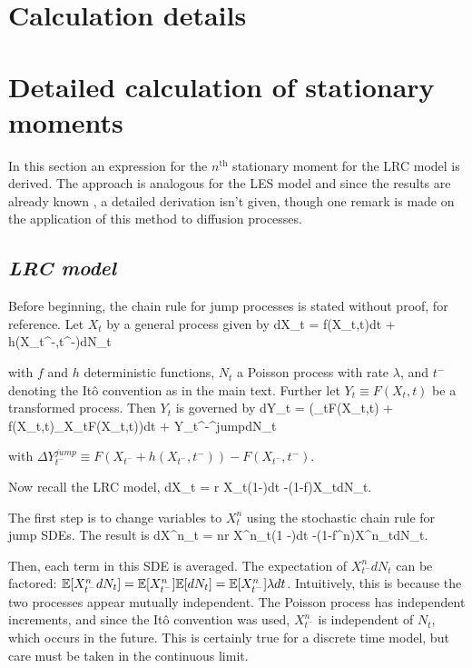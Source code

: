 
\section{Calculation details}
\label{section:calculation_details}

\section*{Detailed calculation of stationary moments}
In this section an expression for the $n^{\text{th}}$ stationary moment for the LRC model is derived.  The approach is analogous for the LES model and since the results are already known \cite{engen2000}, a detailed derivation isn't given, though one remark is made on the application of this method to diffusion processes.

\subsection*{\textit{LRC model}}

Before beginning, the chain rule for jump processes \cite{hansonBook} is stated without proof, for reference.  Let $X_t$ by a general process given by
\be
dX_t = f(X_t,t)dt + h(X_{t^-},t^-)dN_t
\ee

\noindent with $f$ and $h$ deterministic functions, $N_t$ a Poisson process with rate $\lambda$, and $t^-$ denoting the It\^{o} convention as in the main text.  Further let $Y_t \equiv F(X_t,t)$ be a transformed process.  Then $Y_t$ is governed by
\be
dY_t = \left(\partial_tF(X_t,t) + f(X_t,t)\partial_{X_t}F(X_t,t)\right)dt + \Delta Y_{t^-}^{jump}dN_t
\ee

\noindent with $\Delta Y_{t^-}^{jump} \equiv F(X_{t^-} + h(X_{t^-},t^-)) - F(X_{t^-},t^-)$.


Now recall the LRC model,
\be
dX_t = r X_t\left(1-\right)dt  -(1-f)X_tdN_t.
\ee

\noindent The first step is to change variables to $X^n_t$ using the stochastic chain rule for jump SDEs.  The result is
\be
dX^n_t = nr X^n_t\left(1 -\right)dt -(1-f^n)X^n_tdN_t.
\ee

\noindent Then, each term in this SDE is averaged.  The expectation of $X^n_{t^-}dN_t$ can be factored:  $\mathbb{E}[X^n_{t^-}dN_t] = \mathbb{E}[X^n_{t^-}]\mathbb{E}[dN_t] = \mathbb{E}[X^n_{t^-}]\lambda dt$.  Intuitively, this is because the two processes appear mutually independent.  The Poisson process has independent increments, and since the It\^{o} convention was used, $X^n_{t^-}$ is independent of $N_t$, which occurs in the future.  This is certainly true for a discrete time model, but care must be taken in the continuous limit.  

